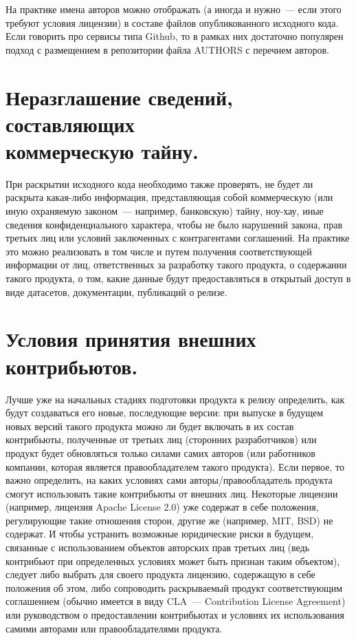 \documentclass[10pt, a5paper]{article}
\begin{document}
На практике имена авторов можно отображать (а иногда и нужно~--- если этого требуют условия лицензии) в составе файлов опубликованного исходного кода. Если говорить про сервисы типа Git\-hub, то в рамках них достаточно популярен подход с размещением в репозитории файла AUTHORS с перечнем авторов.

\section*{Неразглашение сведений, составляющих\\ коммерческую тайну.} 
При раскрытии исходного кода необходимо также проверять, не будет ли раскрыта какая-либо информация, представляющая собой коммерческую (или иную охраняемую законом~--- например, банковскую) тайну, ноу-хау, иные сведения конфиденциального характера, чтобы не было нарушений закона, прав третьих лиц или условий заключенных с контрагентами соглашений. На практике это можно реализовать в том числе и путем получения соответствующей информации от лиц, ответственных за разработку такого продукта, о содержании такого продукта, о том, какие данные будут предоставляться в открытый доступ в виде датасетов, документации, публикаций о релизе.

\section*{Условия принятия внешних контрибьютов.} 
Лучше уже на начальных стадиях подготовки продукта к релизу определить, как будут создаваться его новые, последующие версии: при выпуске в будущем новых версий такого продукта можно ли будет включать в их состав контрибьюты, полученные от третьих лиц (сторонних разработчиков) или продукт будет обновляться только силами самих авторов (или работников компании, которая является правообладателем такого продукта). Если первое, то важно определить, на каких условиях сами авторы/правообладатель продукта смогут использовать такие контрибьюты от внешних лиц. Некоторые лицензии (например, лицензия Apache License 2.0) уже содержат в себе положения, регулирующие такие отношения сторон, другие же (например, MIT, BSD) не содержат. И чтобы устранить возможные юридические риски в будущем, связанные с использованием объектов авторских прав третьих лиц (ведь контрибьют при определенных условиях может быть признан таким объектом), следует либо выбрать для своего продукта лицензию, содержащую в себе положения об этом, либо сопроводить раскрываемый продукт соответствующим соглашением (обычно имеется в виду CLA~--- Contribution License Agreement) или руководством о предоставлении контрибьютах и условиях их использования самими авторами или правообладателями продукта.
\end{document}
